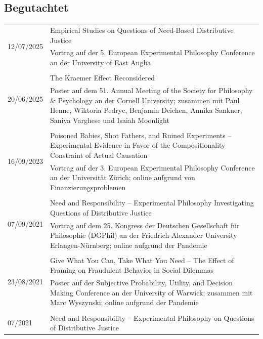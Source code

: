 \documentclass[a4paper,10pt]{article}
\begin{document}
\subsection*{Begutachtet}
\begin{longtable}{p{2.5cm}p{11cm}}
\multirow{2}{2.5cm}{\footnotesize{12/07/2025}} & Empirical Studies on Questions of Need-Based Distributive Justice\\
& \footnotesize{Vortrag auf der 5. European Experimental Philosophy Conference an der University of East Anglia}\\
\\
\multirow{2}{2.5cm}{\footnotesize{20/06/2025}} & The Kraemer Effect Reconsidered\\
& \footnotesize{Poster auf dem 51. Annual Meeting of the Society for Philosophy \& Psychology an der Cornell University; zusammen mit Paul Henne, Wiktoria Pedryc, Benjamin Deichen, Annika Sankner, Saniya Varghese und Isaiah Moonlight}\\
\\
\multirow{2}{2.5cm}{\footnotesize{16/09/2023}} & Poisoned Babies, Shot Fathers, and Ruined Experiments -- Experimental Evidence in Favor of the Compositionality Constraint of Actual Causation\\
& \footnotesize{Vortrag auf der 3. European Experimental Philosophy Conference an der Universität Zürich; online aufgrund von Finanzierungsproblemen}\\
\\
\multirow{2}{2.5cm}{\footnotesize{07/09/2021}} & Need and Responsibility -- Experimental Philosophy Investigating Questions of Distributive Justice\\
& \footnotesize{Vortrag auf dem 25. Kongress der Deutschen Gesellschaft für Philosophie (DGPhil) an der Friedrich-Alexander University Erlangen-Nürnberg; online aufgrund der Pandemie}\\
\\
\multirow{2}{2.5cm}{\footnotesize{23/08/2021}} & Give What You Can, Take What You Need -- The Effect of Framing on Fraudulent Behavior in Social Dilemmas\\
& \footnotesize{Poster auf der Subjective Probability, Utility, and Decision Making Conference an der University of Warwick; zusammen mit Marc Wyszynski; online aufgrund der Pandemie}\\
\\
\multirow{2}{2.5cm}{\footnotesize{07/2021}} & Need and Responsibility -- Experimental Philosophy on Questions of Distributive Justice\\

\end{longtable}
\end{document}
